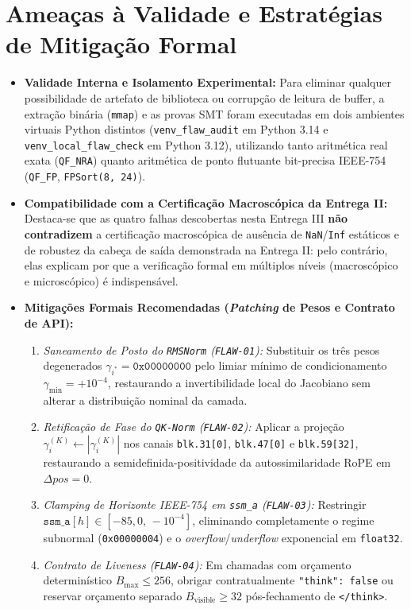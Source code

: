 \documentclass[11pt,a4paper]{article}
\theoremstyle{definition}
\begin{document}
\section{Ameaças à Validade e Estratégias de Mitigação Formal}

\begin{itemize}
    \item \textbf{Validade Interna e Isolamento Experimental:} Para eliminar qualquer possibilidade de artefato de biblioteca ou corrupção de leitura de buffer, a extração binária (\texttt{mmap}) e as provas SMT foram executadas em dois ambientes virtuais Python distintos (\texttt{venv\_flaw\_audit} em Python 3.14 e \texttt{venv\_local\_flaw\_check} em Python 3.12), utilizando tanto aritmética real exata (\texttt{QF\_NRA}) quanto aritmética de ponto flutuante bit-precisa IEEE-754 (\texttt{QF\_FP}, \texttt{FPSort(8, 24)}).
    \item \textbf{Compatibilidade com a Certificação Macroscópica da Entrega II:} Destaca-se que as quatro falhas descobertas nesta Entrega III \textbf{não contradizem} a certificação macroscópica de ausência de \texttt{NaN}/\texttt{Inf} estáticos e de robustez da cabeça de saída demonstrada na Entrega II: pelo contrário, elas explicam por que a verificação formal em múltiplos níveis (macroscópico e microscópico) é indispensável.
    \item \textbf{Mitigações Formais Recomendadas (\textit{Patching} de Pesos e Contrato de API):}
    \begin{enumerate}
        \item \textit{Saneamento de Posto do \texttt{RMSNorm} (\texttt{FLAW-01}):} Substituir os três pesos degenerados $\gamma_{i^*} = \texttt{0x00000000}$ pelo limiar mínimo de condicionamento $\gamma_{\min} = +10^{-4}$, restaurando a invertibilidade local do Jacobiano sem alterar a distribuição nominal da camada.
        \item \textit{Retificação de Fase do \texttt{QK-Norm} (\texttt{FLAW-02}):} Aplicar a projeção $\gamma_i^{(K)} \leftarrow |\gamma_i^{(K)}|$ nos canais \texttt{blk.31[0]}, \texttt{blk.47[0]} e \texttt{blk.59[32]}, restaurando a semidefinida-positividade da autossimilaridade RoPE em $\Delta pos = 0$.
        \item \textit{Clamping de Horizonte IEEE-754 em \texttt{ssm\_a} (\texttt{FLAW-03}):} Restringir $\texttt{ssm\_a}[h] \in [-85{,}0,\, -10^{-4}]$, eliminando completamente o regime subnormal (\texttt{0x00000004}) e o \textit{overflow}/\textit{underflow} exponencial em \texttt{float32}.
        \item \textit{Contrato de \textit{Liveness} (\texttt{FLAW-04}):} Em chamadas com orçamento determinístico $B_{\max} \le 256$, obrigar contratualmente \texttt{"think": false} ou reservar orçamento separado $B_{\text{visible}} \ge 32$ pós-fechamento de \texttt{</think>}.
    \end{enumerate}
\end{itemize}
\end{document}
